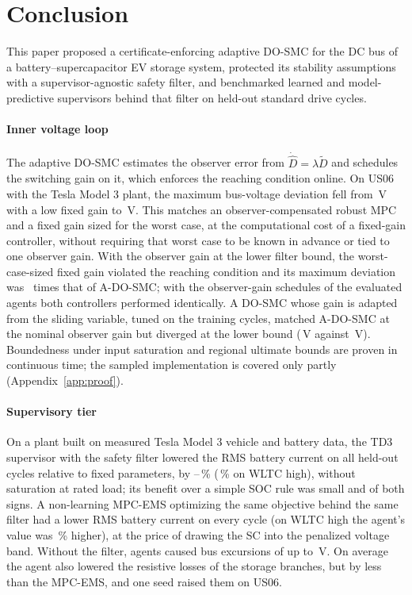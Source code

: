 \section{Conclusion}\label{sec:conclusion}
This paper proposed a certificate-enforcing adaptive DO-SMC for the DC bus of a battery--supercapacitor EV storage system, protected its stability assumptions with a supervisor-agnostic safety filter, and benchmarked learned and model-predictive supervisors behind that filter on held-out standard drive cycles.

\paragraph{Inner voltage loop}
The adaptive DO-SMC estimates the observer error from $\dot{\hat D}=\lambda\tilde D$ and schedules the switching gain on it, which enforces the reaching condition online. On US06 with the Tesla Model 3 plant, the maximum bus-voltage deviation fell from \TOneLoUSMax\,V with a low fixed gain to \TOneAUSMax\,V. This matches an observer-compensated robust MPC and a fixed gain sized for the worst case, at the computational cost of a fixed-gain controller, without requiring that worst case to be known in advance or tied to one observer gain. With the observer gain at the lower filter bound, the worst-case-sized fixed gain violated the reaching condition and its maximum deviation was \LamFactorHi\ times that of A-DO-SMC; with the observer-gain schedules of the evaluated agents both controllers performed identically. A DO-SMC whose gain is adapted from the sliding variable, tuned on the training cycles, matched A-DO-SMC at the nominal observer gain but diverged at the lower bound (\CmpAsLMax\,V against \CmpALMax\,V). Boundedness under input saturation and regional ultimate bounds are proven in continuous time; the sampled implementation is covered only partly (Appendix~\ref{app:proof}).

\paragraph{Supervisory tier}
On a plant built on measured Tesla Model 3 vehicle and battery data, the TD3 supervisor with the safety filter lowered the RMS battery current on all held-out cycles relative to fixed parameters, by --\,\% (\,\% on WLTC high), without saturation at rated load; its benefit over a simple SOC rule was small and of both signs. A non-learning MPC-EMS optimizing the same objective behind the same filter had a lower RMS battery current on every cycle (on WLTC high the agent's value was \,\% higher), at the price of drawing the SC into the penalized voltage band. Without the filter, agents caused bus excursions of up to \,V. On average the agent also lowered the resistive losses of the storage branches, but by less than the MPC-EMS, and one seed raised them on US06.

